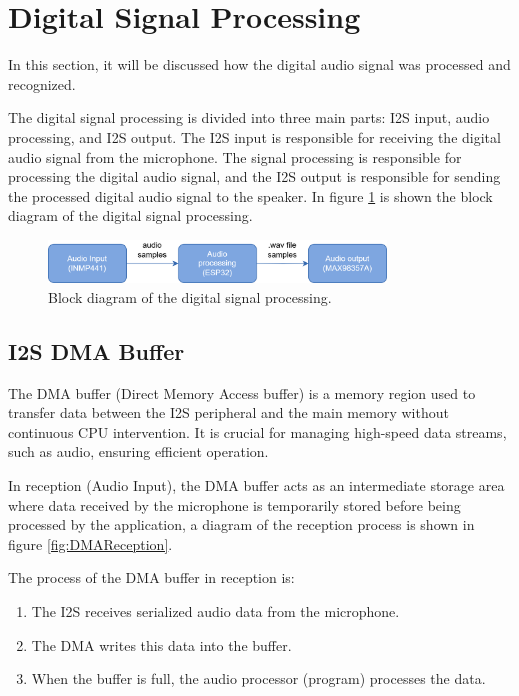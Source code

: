
\section{Digital Signal Processing}

In this section, it will be discussed how the digital audio signal was processed and recognized. 

The digital signal processing is divided into three main parts: I2S input, audio processing, and I2S output. The I2S input is responsible for receiving the digital audio signal from the microphone. The signal processing is responsible for processing the digital audio signal, and the I2S output is responsible for sending the processed digital audio signal to the speaker. In figure \ref{fig:DigitalInterface} is shown the block diagram of the digital signal processing.

\begin{figure}[H]
    \centering
    \includegraphics[width=0.8\textwidth]{Images/audio_processing_diagraampng.png}
    \caption{Block diagram of the digital signal processing.}
    \label{fig:DigitalInterface}
\end{figure}

\subsection{I2S DMA Buffer}

The DMA buffer (Direct Memory Access buffer) is a memory region used to transfer data between the I2S peripheral and the main memory without continuous CPU intervention. It is crucial for managing high-speed data streams, such as audio, ensuring efficient operation.

In reception (Audio Input), the DMA buffer acts as an intermediate storage area where data received by the microphone is temporarily stored before being processed by the application, a diagram of the reception process is shown in figure \ref{fig:DMAReception}.

The process of the DMA buffer in reception is:
\begin{enumerate}
    \item The I2S receives serialized audio data from the microphone.
    \item The DMA writes this data into the buffer.
    \item When the buffer is full, the audio processor (program) processes the data.
\end{enumerate}


